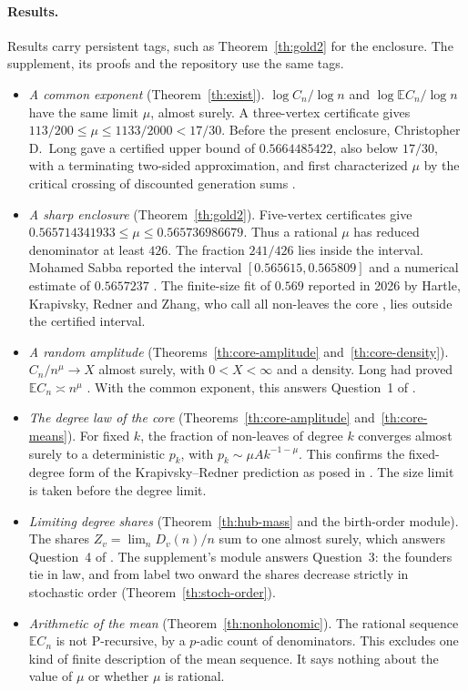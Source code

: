 \documentclass[11pt]{article}
\theoremstyle{remark}
\newcommand{\E}{\mathbb E}
\begin{document}
\paragraph{Results.} Results carry persistent tags, such as Theorem~\ref{th:gold2} for the enclosure. The supplement, its proofs and the repository use the same tags.
\begin{itemize}\setlength{\itemsep}{1pt}
\item \emph{A common exponent} (Theorem~\ref{th:exist}). $\log C_n/\log n$ and $\log\E C_n/\log n$ have the same limit $\mu$, almost surely. A three-vertex certificate gives $113/200\le\mu\le1133/2000<17/30$. Before the present enclosure, Christopher D.\ Long gave a certified upper bound of $0.5664485422$, also below $17/30$, with a terminating two-sided approximation, and first characterized $\mu$ by the critical crossing of discounted generation sums \cite{LongKernel}.
\item \emph{A sharp enclosure} (Theorem~\ref{th:gold2}). Five-vertex certificates give $0.565714341933\le\mu\le0.565736986679$. Thus a rational $\mu$ has reduced denominator at least $426$. The fraction $241/426$ lies inside the interval. Mohamed Sabba reported the interval $[0.565615,0.565809]$ and a numerical estimate of $0.5657237$ \cite{Sabba}. The finite-size fit of $0.569$ reported in 2026 by Hartle, Krapivsky, Redner and Zhang, who call all non-leaves the core \cite[Fig.~6]{HKRZ}, lies outside the certified interval.
\item \emph{A random amplitude} (Theorems~\ref{th:core-amplitude} and~\ref{th:core-density}). $C_n/n^\mu\to X$ almost surely, with $0<X<\infty$ and a density. Long had proved $\E C_n\asymp n^\mu$ \cite{LongMean}. With the common exponent, this answers Question~1 of \cite[Sec.~7]{AB}.
\item \emph{The degree law of the core} (Theorems~\ref{th:core-amplitude} and~\ref{th:core-means}). For fixed $k$, the fraction of non-leaves of degree $k$ converges almost surely to a deterministic $p_k$, with $p_k\sim\mu Ak^{-1-\mu}$. This confirms the fixed-degree form of the Krapivsky--Redner prediction as posed in \cite[Sec.~7, Question~2]{AB}. The size limit is taken before the degree limit.
\item \emph{Limiting degree shares} (Theorem~\ref{th:hub-mass} and the birth-order module). The shares $Z_v=\lim_n D_v(n)/n$ sum to one almost surely, which answers Question~4 of \cite[Sec.~7]{AB}. The supplement's module answers Question~3: the founders tie in law, and from label two onward the shares decrease strictly in stochastic order (Theorem~\ref{th:stoch-order}).
\item \emph{Arithmetic of the mean} (Theorem~\ref{th:nonholonomic}). The rational sequence $\E C_n$ is not P-recursive, by a $p$-adic count of denominators. This excludes one kind of finite description of the mean sequence. It says nothing about the value of $\mu$ or whether $\mu$ is rational.
\end{itemize}
\end{document}
